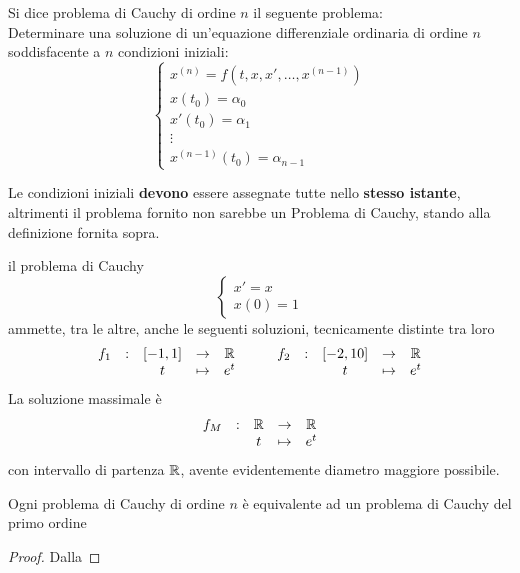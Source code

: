 \begin{definition}
	Si dice problema di Cauchy di ordine $n$ il seguente problema:\\
	Determinare una soluzione di un'equazione differenziale ordinaria di ordine $n$ soddisfacente a $n$ condizioni iniziali:
	\[\begin{cases}
		x^{(n)}=f(t,x,x',\dotsc,x^{(n-1)})\\
		x(t_0)=\alpha_0\\
		x'(t_0)=\alpha_1\\
		\vdots\\
		x^{(n-1)}(t_0)=\alpha_{n-1}
	\end{cases}\]
\end{definition}
\begin{note}
	Le condizioni iniziali \textbf{devono} essere assegnate tutte nello \textbf{stesso istante}, altrimenti il problema fornito non sarebbe un Problema di Cauchy, stando alla definizione fornita sopra.
\end{note}
\begin{example}
	il problema di Cauchy \[\begin{cases}x'=x\\x(0)=1\end{cases}\]
	ammette, tra le altre, anche le seguenti soluzioni, tecnicamente distinte tra loro
	\[\begin{array}{ccccc} {f_1} & : & { \left[-1,1\right] } & \to & {\mathbb{R}} \\ & & {t} & \mapsto & {e^t} \\ \end{array} \qquad \begin{array}{ccccc} {f_2} & : & { \left[-2,10\right] } & \to & {\mathbb{R}} \\ & & {t} & \mapsto & {e^t} \\ \end{array}\]
	La soluzione massimale è
	\[\begin{array}{ccccc} {f_M} & : & {\mathbb{R}} & \to & {\mathbb{R}} \\ & & {t} & \mapsto & {e^t} \\ \end{array}\]
	con intervallo di partenza $\mathbb{R}$, avente evidentemente diametro maggiore possibile.
\end{example}
\begin{proposition}
	Ogni problema di Cauchy di ordine $n$ è equivalente ad un problema di Cauchy del primo ordine
	\begin{proof}
		Dalla 
	\end{proof}
\end{proposition}

